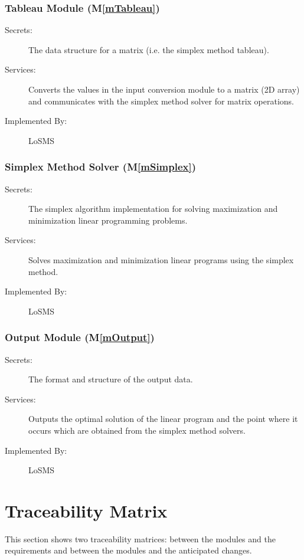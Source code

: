 \documentclass[12pt, titlepage]{article}
\newcommand{\mref}[1]{M\ref{#1}}
\newcommand{\famname}{LoSMS} %
\begin{document}
\subsubsection{Tableau Module (\mref{mTableau})}
\begin{description}
	\item[Secrets:]The data structure for a matrix (i.e. the simplex method 
	tableau).
	\item[Services:]Converts the values in the input conversion module to a 
	matrix (2D array) and communicates with the simplex method solver for 
	matrix operations.
	\item[Implemented By:] \famname{}
\end{description}

\subsubsection{Simplex Method Solver (\mref{mSimplex})}

\begin{description}
	\item[Secrets:]The simplex algorithm implementation for solving 
	maximization and minimization linear programming problems.
	\item[Services:]Solves maximization and minimization linear programs using 
	the simplex method.
	\item[Implemented By:] \famname{}
\end{description}

\subsubsection{Output Module (\mref{mOutput})}

\begin{description}
	\item[Secrets:]The format and structure of the output data.
	\item[Services:]Outputs the optimal solution of the linear program and the 
	point where it occurs which are obtained from the simplex method solvers.
	\item[Implemented By:] \famname{}
\end{description}

\section{Traceability Matrix} \label{SecTM}
This section shows two traceability matrices: between the modules and the
requirements and between the modules and the anticipated changes.
\end{document}
